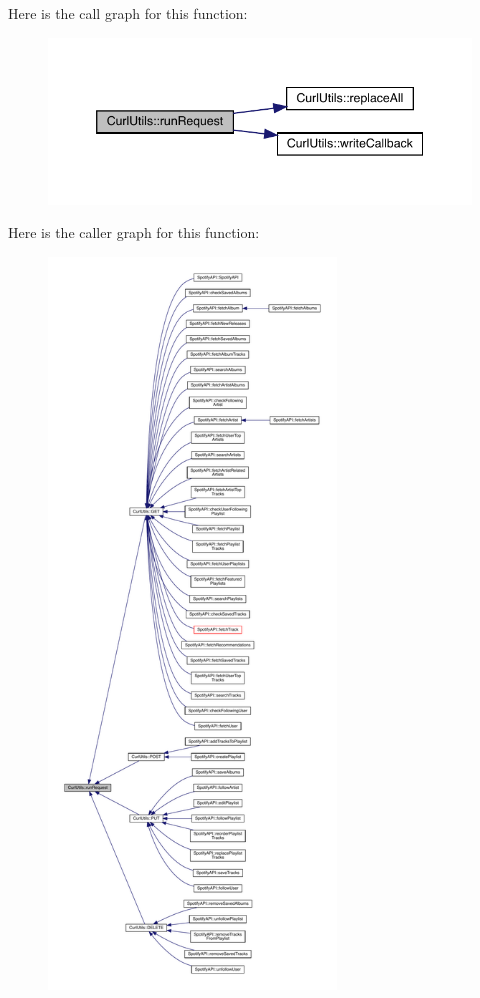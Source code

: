 Here is the call graph for this function\+:
\nopagebreak
\begin{figure}[H]
\begin{center}
\leavevmode
\includegraphics[width=346pt]{class_curl_utils_a596d1f41d3e300c4c626b4e4f819c194_cgraph}
\end{center}
\end{figure}
Here is the caller graph for this function\+:
\nopagebreak
\begin{figure}[H]
\begin{center}
\leavevmode
\includegraphics[height=550pt]{class_curl_utils_a596d1f41d3e300c4c626b4e4f819c194_icgraph}
\end{center}
\end{figure}
\mbox{\label{class_curl_utils_a1e068c580af8fc71663e220c6b2128c3}} 
